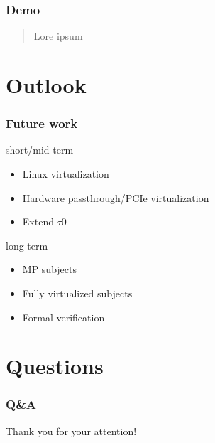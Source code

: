\documentclass{beamer}
\begin{document}
\begin{frame}\frametitle{Demo}
	\begin{quote}
		Lore ipsum
	\end{quote}
\end{frame}

\section{Outlook}
\begin{frame}\frametitle{Future work}
\begin{block}{short/mid-term}
\begin{itemize}
	\item Linux virtualization
	\item Hardware passthrough/PCIe virtualization
	\item Extend $\tau$0
	\end{itemize}
\end{block}
\begin{block}{long-term}
	\begin{itemize}
		\item MP subjects
		\item Fully virtualized subjects
		\item Formal verification
	\end{itemize}
\end{block}
\end{frame}

\section{Questions}
\begin{frame}\frametitle{Q\&A}
\begin{center}
	Thank you for your attention!
\end{center}
\end{frame}
\end{document}
